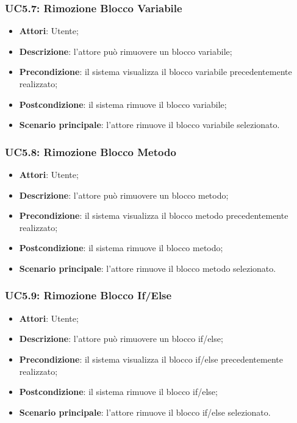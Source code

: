 \subsubsection{UC5.7: Rimozione Blocco Variabile}
\label{UC5.7}
\begin{itemize}
\item \textbf{Attori}: Utente;
\item \textbf{Descrizione}: l'attore può rimuovere un blocco variabile;	
\item \textbf{Precondizione}: il sistema visualizza il blocco variabile precedentemente realizzato;	
\item \textbf{Postcondizione}: il sistema rimuove il blocco variabile;	
\item \textbf{Scenario principale}:
l'attore rimuove il blocco variabile selezionato.	
\end{itemize}

\subsubsection{UC5.8: Rimozione Blocco Metodo}
\label{UC5.8}
\begin{itemize}
\item \textbf{Attori}: Utente;
\item \textbf{Descrizione}: l'attore può rimuovere un blocco metodo;	
\item \textbf{Precondizione}: il sistema visualizza il blocco metodo precedentemente realizzato;	
\item \textbf{Postcondizione}: il sistema rimuove il blocco metodo;	
\item \textbf{Scenario principale}:
l'attore rimuove il blocco metodo selezionato.	
\end{itemize}

\subsubsection{UC5.9: Rimozione Blocco If/Else}
\label{UC5.9}
\begin{itemize}
\item \textbf{Attori}: Utente;
\item \textbf{Descrizione}: l'attore può rimuovere un blocco if/else;	
\item \textbf{Precondizione}: il sistema visualizza il blocco if/else precedentemente realizzato;	
\item \textbf{Postcondizione}: il sistema rimuove il blocco if/else;	
\item \textbf{Scenario principale}:
l'attore rimuove il blocco if/else selezionato.	
\end{itemize}

